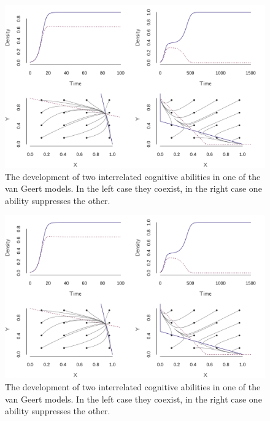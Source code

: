 \documentclass[
  a4paper,
  DIV=11,
  numbers=noendperiod,
  oneside]{scrreprt}
\begin{document}
\begin{figure}

{\centering \includegraphics{media/ch4n/fig-ch4n-img11-old-59.png}

}

\caption{\label{fig-ch4n-img11-old-59}The development of two
interrelated cognitive abilities in one of the van Geert models. In the
left case they coexist, in the right case one ability suppresses the
other.}

\end{figure}

\begin{figure}

{\centering \includegraphics{media/ch4n/fig-ch4n-img11-old-59.png}

}

\caption{The development of two interrelated cognitive abilities in one
of the van Geert models. In the left case they coexist, in the right
case one ability suppresses the other.}

\end{figure}
\end{document}
